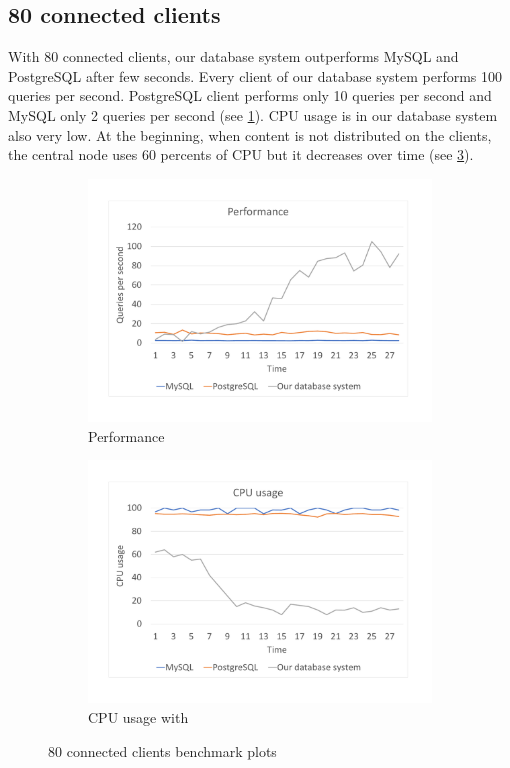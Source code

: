 \subsection{80 connected clients}
With 80 connected clients, our database system outperforms MySQL and PostgreSQL after few seconds. Every client of our database system performs 100 queries per second. PostgreSQL client performs only 10 queries per second and MySQL only 2 queries per second (see \ref{bench80per}). CPU usage is in our database system also very low. At the beginning, when content is not distributed on the clients, the central node uses 60 percents of CPU but it decreases over time (see \ref{bench80cpu}).


\begin{figure}[h]
    \begin{subfigure}{.5\textwidth}
        \centering
        \includegraphics[trim={1.78cm 2cm 2.08cm 1cm},clip,width=1.0\linewidth]{excel/80per.pdf}
        \caption{Performance}
        \label{bench80per}
    \end{subfigure}
    \begin{subfigure}{.5\textwidth}
        \centering
        \includegraphics[trim={1.78cm 2cm 2.08cm 1cm},clip,width=1.0\linewidth]{excel/80cpu.pdf}
        \caption{CPU usage with}
        \label{bench80cpu}
    \end{subfigure}
    \caption{80 connected clients benchmark plots}
\end{figure}


